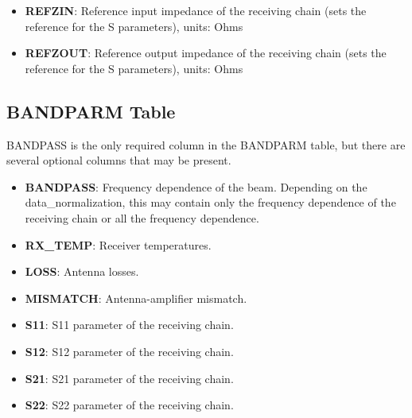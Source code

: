 \documentclass[11pt, oneside]{article}   	%
\begin{document}
\begin{itemize}
\item{\textbf{REFZIN}: Reference input impedance of the receiving chain (sets the reference for the S parameters), units: Ohms}
\item{\textbf{REFZOUT}: Reference output impedance of the receiving chain (sets the reference for the S parameters), units: Ohms}
\end{itemize}

\subsection{BANDPARM Table}
BANDPASS is the only required column in the BANDPARM table, but there are several optional columns that may be present.

\begin{itemize}
\item{\textbf{BANDPASS}: Frequency dependence of the beam. Depending on the data\_normalization, this may contain only the frequency dependence of the receiving chain or all the frequency dependence.}
\item{\textbf{RX\_TEMP}: Receiver temperatures.}
\item{\textbf{LOSS}: Antenna losses.}
\item{\textbf{MISMATCH}: Antenna-amplifier mismatch.}
\item{\textbf{S11}: S11 parameter of the receiving chain.}
\item{\textbf{S12}: S12 parameter of the receiving chain.}
\item{\textbf{S21}: S21 parameter of the receiving chain.}
\item{\textbf{S22}: S22 parameter of the receiving chain.}
\end{itemize}
\end{document}
